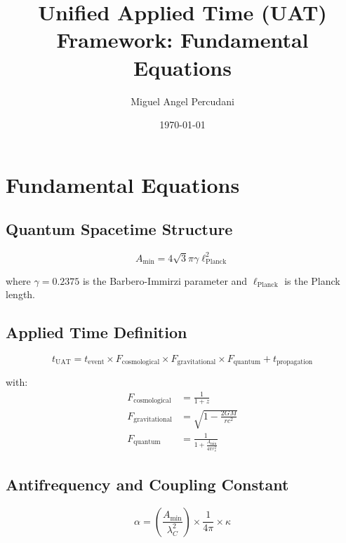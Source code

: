 \documentclass[12pt]{article}
\begin{document}
        \title{Unified Applied Time (UAT) Framework: Fundamental Equations}
        \author{Miguel Angel Percudani}
        \date{\today}

        \maketitle

        \section{Fundamental Equations}

        \subsection{Quantum Spacetime Structure}

        \begin{equation}
        A_{\text{min}} = 4\sqrt{3}\pi\gamma \ell_{\text{Planck}}^2
        \end{equation}

        where $\gamma = 0.2375$ is the Barbero-Immirzi parameter and $\ell_{\text{Planck}}$ is the Planck length.

        \subsection{Applied Time Definition}

        \begin{equation}
        t_{\text{UAT}} = t_{\text{event}} \times F_{\text{cosmological}} \times F_{\text{gravitational}} \times F_{\text{quantum}} + t_{\text{propagation}}
        \end{equation}

        with:
        \begin{align*}
        F_{\text{cosmological}} &= \frac{1}{1+z} \\
        F_{\text{gravitational}} &= \sqrt{1 - \frac{2GM}{rc^2}} \\
        F_{\text{quantum}} &= \frac{1}{1 + \frac{A_{\text{min}}}{4\pi r_s^2}}
        \end{align*}

        \subsection{Antifrequency and Coupling Constant}

        \begin{equation}
        \alpha = \left(\frac{A_{\text{min}}}{\lambda_C^2}\right) \times \frac{1}{4\pi} \times \kappa
        \end{equation}
\end{document}

